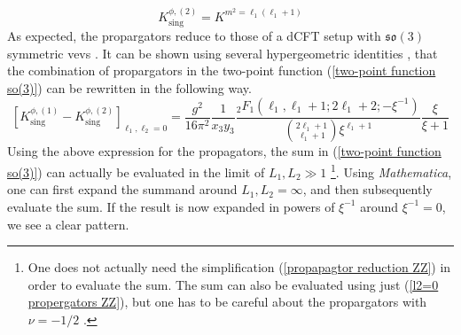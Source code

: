 %
%
\begin{equation}\label{l2=0 propergators ZZ}
K^{\phi,(2)}_{\mathrm{sing}}
=
K^{m^2 = \ell_1 (\ell_1 + 1)}
\end{equation}
%
%
As expected, the propargators reduce to those of a dCFT setup with $\mathfrak{so}(3)$ symmetric vevs \cite{One-point functions in D5-D3}. It can be shown using several hypergeometric identities \cite{Two-point functions in D5-D3}, that the combination of propargators in the two-point function (\ref{two-point function so(3)}) can be rewritten in the following way.
%
%
\begin{equation}\label{propapagtor reduction ZZ}
\left[
K^{\phi,(1)}_{\mathrm{sing}}
-
K^{\phi,(2)}_{\mathrm{sing}}
\right]_{\ell_1, \ell_2 = 0}
=
\frac{g^2}{16 \pi^2} \frac{1}{x_3 y_3} \frac{{}_2 F_1(\ell_1, \ell_1 + 1; 2 \ell_1 + 2; -\xi^{-1})}{\binom{2 \ell_1 + 1}{\ell_1 + 1} \xi^{\ell_1+1}}
\frac{\xi}{\xi+1}
\end{equation}
%
%
Using the above expression for the propagators, the sum in (\ref{two-point function so(3)}) can actually be evaluated in the limit of $L_1, L_2 \gg 1$ \footnote{One does not actually need the simplification (\ref{propapagtor reduction ZZ}) in order to evaluate the sum. The sum can also be evaluated using just (\ref{l2=0 propergators ZZ}), but one has to be careful about the propargators with $\nu = -1/2$ \cite{Two-point functions in D5-D3}.}. Using \textit{Mathematica}, one can first expand the summand around $L_1, L_2 = \infty$, and then subsequently evaluate the sum. If the result is now expanded in powers of $\xi^{-1}$ around $\xi^{-1} = 0$, we see a clear pattern.

